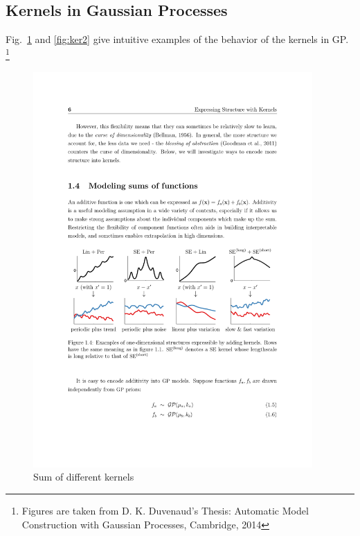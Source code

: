 \subsection{Kernels in Gaussian Processes}
Fig.~\ref{fig:ker1} and \ref{fig:ker2} give intuitive examples of the behavior of the kernels in GP. \footnote{Figures are taken from D. K. Duvenaud's Thesis: Automatic Model Construction with Gaussian Processes, Cambridge, 2014}
\newpage
\begin{figure}[h]
\center
	\includegraphics[width=0.95\textwidth]{figures/kernel1}
	\caption{Sum of different kernels \label{fig:ker1}}
\end{figure}
\vspace{0.5cm}
